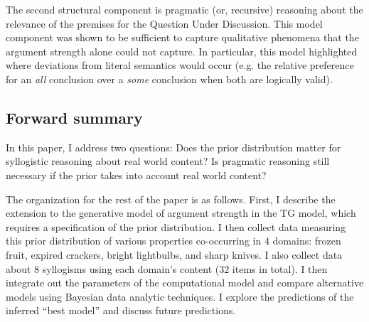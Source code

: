 \documentclass{llncs} %
\begin{document}
The second structural component is pragmatic (or, recursive) reasoning about the relevance of the premises for the Question Under Discussion. This model component was shown to be sufficient to capture qualitative phenomena that the argument strength alone could not capture. In particular, this model highlighted where deviations from literal semantics would occur (e.g. the relative preference for an \emph{all} conclusion over a \emph{some} conclusion when both are logically valid). 

\subsection{Forward summary}

In this paper, I address two questions: Does the prior distribution matter for syllogistic reasoning about real world content? Is pragmatic reasoning still necessary if the prior takes into account real world content? 

The organization for the rest of the paper is as follows. First, I describe the extension to the generative model of argument strength in the TG model, which requires a specification of the prior distribution. I then collect data measuring this prior distribution of various properties co-occurring in 4 domains: frozen fruit, expired crackers, bright lightbulbs, and sharp knives. I also collect data about 8 syllogisms using each domain's content (32 items in total). I then integrate out the parameters of the computational model and compare alternative models using Bayesian data analytic techniques. I explore the predictions of the inferred ``best model'' and discuss future predictions. 
\end{document}
